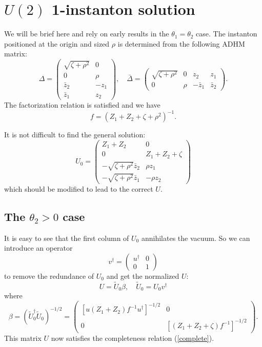 \documentclass[a4paper,a4paper]{article}
\begin{document}
\section{$U(2)$ 1-instanton solution}

We will be brief here and rely on early results in the
$\theta_1=\theta_2$ case. The instanton positioned at the origin
and sized $\rho$ is determined from the following ADHM matrix:
\begin{equation}
\Delta=\left(\begin{array}{cc} \sqrt{\zeta+\rho^2} &
0 \\ 0 & \rho \\ \bar z_2 & -z_1 \\ \bar z_1 & z_2
\end{array}\right),
\quad\bar\Delta=\left(\begin{array}{cccc}
\sqrt{\zeta+\rho^2} & 0 & z_2 & z_1 \\
0 & \rho & -\bar z_1 & \bar z_2 \end{array}\right).
\end{equation}
The factorization relation is satisfied and we have
\begin{equation}
f=(Z_1+Z_2+\zeta+\rho^2)^{-1}.
\end{equation}

It is not difficult to find the general solution:
\begin{equation}
U_0=\left(\begin{array}{cc} Z_1+Z_2 & 0 \\ 0 & Z_1+Z_2+\zeta \\
-\sqrt{\zeta+\rho^2}\bar z_2 & \rho z_1 \\ -\sqrt{\zeta+\rho^2}
\bar z_1 & -\rho z_2 \end{array}\right)
\end{equation}
which should be  modified to lead to the correct $U$.

\subsection{The $\theta_2>0$ case}

It is easy to see that the first column of $U_0$ annihilates the
vacuum. So we can introduce an operator
\begin{equation}
v^\dag=\left(\begin{array}{cc} u^\dag & 0 \\ 0 & 1 \end{array}\right)
\end{equation}
to remove the redundance of $U_0$ and get the normalized $U$:
\begin{equation}
U=\tilde U_0\beta,\quad\tilde U_0=U_0 v^\dag
\end{equation}
where
\begin{equation}
\beta=(\tilde U_0^\dag \tilde U_0)^{-1/2}=\left(\begin{array}{cc}
[u(Z_1+Z_2)f^{-1}u^\dag]^{-1/2} & 0 \\ 0 &
[(Z_1+Z_2+\zeta)f^{-1}]^{-1/2} \end{array}\right).
\end{equation}
This matrix $U$ now satisfies the completeness relation
(\ref{complete}).
\end{document}
